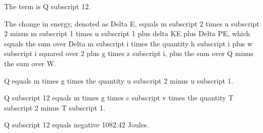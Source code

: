 The term is Q subscript 12.

The change in energy, denoted as Delta E, equals m subscript 2 times u subscript 2 minus m subscript 1 times u subscript 1 plus delta KE plus Delta PE, which equals the sum over Delta m subscript i times the quantity h subscript i plus w subscript i squared over 2 plus g times z subscript i, plus the sum over Q minus the sum over W.

Q equals m times g times the quantity u subscript 2 minus u subscript 1.

Q subscript 12 equals m times g times c subscript v times the quantity T subscript 2 minus T subscript 1.

Q subscript 12 equals negative 1082.42 Joules.